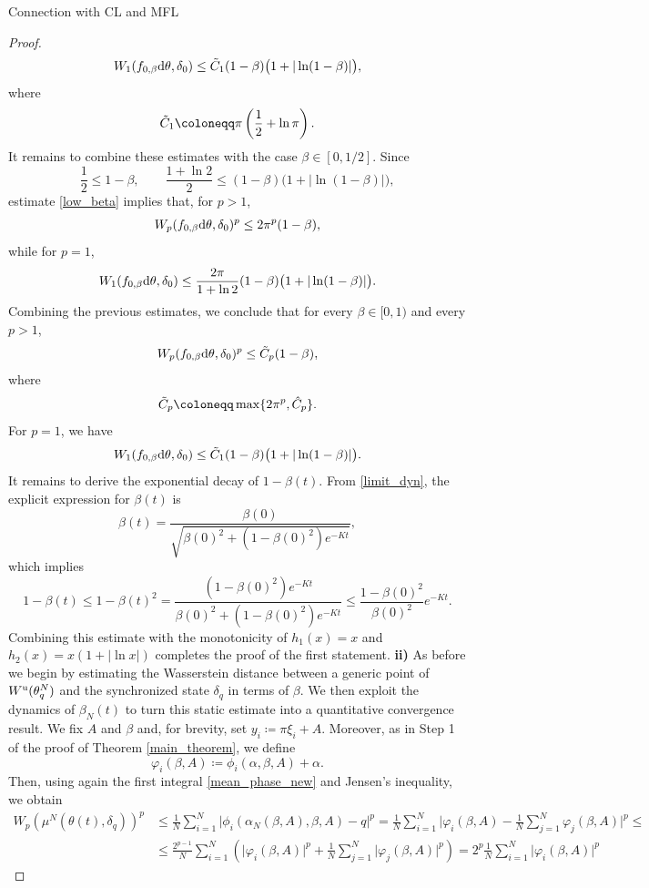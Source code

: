 \documentclass{article}
\theoremstyle{definition}
\newcommand{\jump}{\hfill\break}
\renewcommand{\u}{\textnormal{u}}
\renewcommand{\d}{\textnormal{d}}
\begin{document}
\begin{section}{Connection with CL and MFL}
\begin{proof}
    $$W_1(f_{0,\beta}\d\theta,\delta_0) \leq \Tilde{C}_1(1-\beta)\bigl(1+|\ln(1-\beta)|\bigr),$$
    where $$\Tilde{C}_1\coloneqq \pi\left(\frac12+\ln\pi\right).$$
    It remains to combine these estimates with the case $\beta\in[0,1/2]$. Since
    $$\frac12\leq1-\beta, \qquad \frac{1+\ln2}{2}\leq(1-\beta)\bigl(1+|\ln(1-\beta)|\bigr),$$
    estimate \eqref{low_beta} implies that, for $p>1$,
    $$W_p(f_{0,\beta}\d\theta,\delta_0)^p \leq2\pi^p(1-\beta),$$
    while for $p=1$,
    $$W_1(f_{0,\beta}\d\theta,\delta_0) \leq \frac{2\pi}{1+\ln2} (1-\beta)\bigl(1+|\ln(1-\beta)|\bigr).$$
    Combining the previous estimates, we conclude that for every $\beta\in[0,1)$ and every $p>1$,
    $$W_p(f_{0,\beta}\d\theta,\delta_0)^p \leq \Tilde{C}_p(1-\beta),$$
    where
    $$\Tilde{C}_p\coloneqq\max\{2\pi^p,\hat{C}_p\}.$$
    For $p=1$, we have
    $$W_1(f_{0,\beta}\d\theta,\delta_0) \leq \Tilde{C}_1(1-\beta)\bigl(1+|\ln(1-\beta)|\bigr).$$
    It remains to derive the exponential decay of $1-\beta(t)$. From \eqref{limit_dyn}, the explicit expression for $\beta(t)$ is
    $$\beta(t)=\frac{\beta(0)} {\sqrt{\beta(0)^2+(1-\beta(0)^2)e^{-Kt}}},$$
    which implies
    $$1-\beta(t) \leq 1-\beta(t)^2 = \frac{(1-\beta(0)^2)e^{-Kt}} {\beta(0)^2+(1-\beta(0)^2)e^{-Kt}} \leq \frac{1-\beta(0)^2}{\beta(0)^2}e^{-Kt}.$$
    Combining this estimate with the monotonicity of $h_1(x)=x$ and $h_2(x)=x(1+|\ln x|)$ completes the proof of the first statement. \jump\jump
    \textbf{ii)} As before we begin by estimating the Wasserstein distance between a generic point of $W^\u(\theta_q^N)$ and the synchronized state $\delta_q$ in terms of $\beta$. We then exploit the dynamics of $\beta_N(t)$ to turn this static estimate into a quantitative convergence result.\jump\jump\noindent
     We fix $A$ and $\beta$ and, for brevity, set $y_i\coloneqq\pi\xi_i+A.$ Moreover, as in Step 1 of the proof of Theorem \ref{main_theorem}, we define
    $$\varphi_i(\beta,A)\coloneqq\phi_i(\alpha,\beta,A)+\alpha.$$
    Then, using again the first integral \eqref{mean_phase_new} and Jensen's inequality, we obtain 
    \begin{align*}
           W_p\left(\mu^N(\theta(t),\delta_{q})\right)^p&\leq\frac{1}{N}\sum_{i=1}^N\Big|\phi_i(\alpha_N(\beta,A),\beta,A)-q\Big|^p=\frac{1}{N}\sum_{i=1}^N\Big|\varphi_i(\beta,A)-\frac{1}{N}\sum_{j=1}^N\varphi_j(\beta,A)\Big|^p\leq\\
           &\leq\frac{2^{p-1}}{N}\sum_{i=1}^N\left(\big|\varphi_i(\beta,A)\big|^p+\frac{1}{N}\sum_{j=1}^N\big|\varphi_j(\beta,A)\big|^p\right)=2^p\frac{1}{N}\sum_{i=1}^N\big|\varphi_i(\beta,A)\big|^p

\end{align*}
\end{proof}
\end{section}
\end{document}

